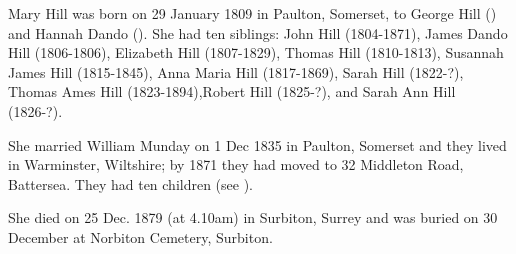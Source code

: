 
Mary Hill was born on 29 January 1809  in Paulton, Somerset, to  George Hill () and Hannah Dando ().\cite{MaryHillBirthDeath}  She had ten siblings:  John Hill (1804-1871), James Dando Hill (1806-1806), Elizabeth Hill (1807-1829), Thomas Hill (1810-1813), Susannah James Hill (1815-1845), Anna Maria Hill (1817-1869), Sarah Hill (1822-?), Thomas Ames Hill (1823-1894),Robert Hill (1825-?), and Sarah Ann Hill (1826-?).

She married William Munday on 1 Dec 1835 in Paulton, Somerset and they lived in Warminster, Wiltshire; by 1871 they had moved to 32 Middleton Road, Battersea. \cite{MHillResidence} They had ten children (see ).  

She died on 25 Dec. 1879 (at 4.10am) in Surbiton, Surrey and was buried on 30 December at Norbiton Cemetery, Surbiton. \cite{MaryHillBirthDeath}

